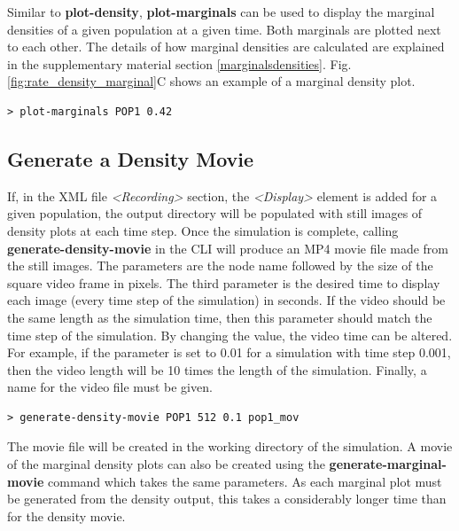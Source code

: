 \documentclass[utf8]{frontiersSCNS} %
\begin{document}
Similar to \textbf{plot-density}, \textbf{plot-marginals} can be used to display the marginal densities of a given population at a given time. Both marginals are plotted next to each other. The details of how marginal densities are calculated are explained in the supplementary material section \ref{marginalsdensities}. Fig. \ref{fig:rate_density_marginal}C shows an example of a marginal density plot.\\

\begin{lstlisting}[language=xml,caption={Plot the marginal distributions of population POP1 at time 0.42s in the CLI.}]
> plot-marginals POP1 0.42
\end{lstlisting}

\subsection{Generate a Density Movie}
\label{densitymovie}
If, in the XML file \textit{\textless Recording\textgreater} section, the \textit{\textless Display\textgreater} element is added for a given population, the output directory will be populated with still images of density plots at each time step. Once the simulation is complete, calling \textbf{generate-density-movie} in the CLI will produce an MP4 movie file made from the still images. The parameters are the node name followed by the size of the square video frame in pixels. The third parameter is the desired time to display each image (every time step of the simulation) in seconds. If the video should be the same length as the simulation time, then this parameter should match the time step of the simulation. By changing the value, the video time can be altered. For example, if the parameter is set to 0.01 for a simulation with time step 0.001, then the video length will be 10 times the length of the simulation. Finally, a name for the video file must be given.

\begin{lstlisting}[language=xml,caption={Generate a movie from the display images of population POP1 with a size of 512 pixels at a simulation replay time step of 0.1s.}]
> generate-density-movie POP1 512 0.1 pop1_mov
\end{lstlisting}

The movie file will be created in the working directory of the simulation. A movie of the marginal density plots can also be created using the \textbf{generate-marginal-movie} command which takes the same parameters. As each marginal plot must be generated from the density output, this takes a considerably longer time than for the density movie.
\end{document}
